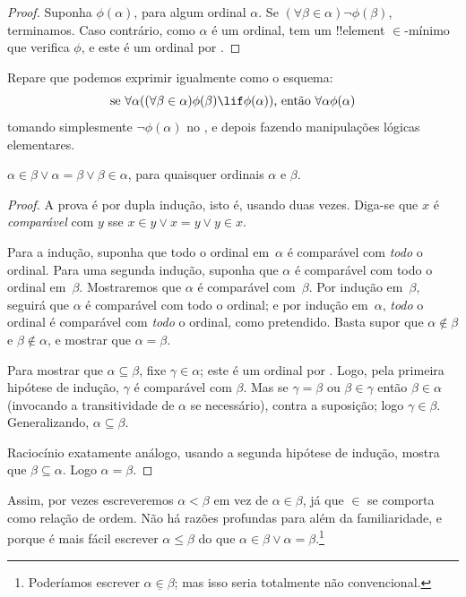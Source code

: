 \documentclass[../../../include/open-logic-section]{subfiles}
\begin{document}
\begin{proof}
Suponha $\phi(\alpha)$, para algum ordinal $\alpha$. Se $ (\forall \beta
\in \alpha) \lnot \phi(\beta)$, terminamos. Caso contrário, como
$\alpha$ é um ordinal, tem um !!{element} $\in$-mínimo que verifica
$\phi$, e este é um ordinal por .
\end{proof}
\noindent
Repare que podemos exprimir igualmente  como o
esquema:
\[
\text{se }\forall \alpha((\forall \beta \in \alpha)\phi(\beta) \lif 
\phi(\alpha))\text{, então }\forall \alpha\phi(\alpha)
\]
tomando simplesmente $\lnot\phi(\alpha)$ no , e depois fazendo manipulações lógicas elementares.

\begin{thm}[Tricotomia] 
$\alpha \in \beta \lor \alpha = \beta \lor \beta \in \alpha$, para quaisquer
ordinais $\alpha$ e $\beta$. 
\end{thm}

\begin{proof}
A prova é por dupla indução, isto é, usando
 duas vezes. Diga-se que $x$ é \emph{comparável}
com $y$ sse $x \in y \lor x = y \lor y \in x$. 

Para a indução, suponha que todo o ordinal em~$\alpha$ é comparável
com \emph{todo} o ordinal. Para uma segunda indução, suponha que
$\alpha$ é comparável com todo o ordinal em~$\beta$. Mostraremos que
$\alpha$ é comparável com~$\beta$. Por indução em~$\beta$, seguirá que
$\alpha$ é comparável com todo o ordinal; e por indução em~$\alpha$,
\emph{todo} o ordinal é comparável com \emph{todo} o ordinal, como
pretendido. Basta supor que $\alpha \notin \beta$ e $\beta \notin
\alpha$, e mostrar que $\alpha = \beta$. 

Para mostrar que $\alpha \subseteq \beta$, fixe $\gamma \in \alpha$; este
é um ordinal por . Logo, pela primeira hipótese de
indução, $\gamma$ é comparável com $\beta$. Mas se $\gamma
= \beta$ ou $\beta \in \gamma$ então $\beta \in \alpha$ (invocando a
transitividade de $\alpha$ se necessário), contra a suposição; logo $\gamma \in \beta$. Generalizando, $\alpha \subseteq
\beta$.

Raciocínio exatamente análogo, usando a segunda hipótese de indução,
mostra que $\beta \subseteq \alpha$. Logo $\alpha = \beta$.
\end{proof}\noindent Assim, por vezes escreveremos $\alpha <\beta$
em vez de $\alpha \in \beta$, já que $\in$ se comporta como relação de
ordem. Não há razões profundas para além da familiaridade, e
porque é mais fácil escrever $\alpha \leq \beta$ do que $\alpha \in
\beta \lor \alpha = \beta$.\footnote{Poderíamos escrever $\alpha
\mathrel{\underline{\in}} \beta$; mas isso seria totalmente não
convencional.}
\end{document}
